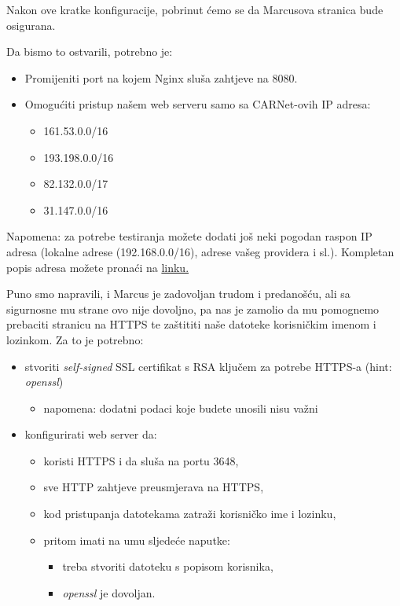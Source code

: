 \documentclass[12pt,a4paper]{article}
\begin{document}
		Nakon ove kratke konfiguracije, pobrinut ćemo se da Marcusova stranica bude osigurana.

		Da bismo to ostvarili, potrebno je:
		\begin{itemize}
			\item Promijeniti port na kojem Nginx sluša zahtjeve na 8080.
			\item Omogućiti pristup našem web serveru samo sa CARNet-ovih IP adresa:
			\begin{itemize}
				\item 161.53.0.0/16
				\item 193.198.0.0/16
				\item 82.132.0.0/17
				\item 31.147.0.0/16
			\end{itemize}
		\end{itemize}
		Napomena: za potrebe testiranja možete dodati još neki pogodan raspon IP adresa (lokalne adrese (192.168.0.0/16), adrese vašeg providera i sl.). Kompletan popis adresa možete pronaći na \href{https://sysportal.carnet.hr/hr_alloclist}{linku.}


		\par Puno smo napravili, i Marcus je zadovoljan trudom i predanošću, ali sa sigurnosne mu strane ovo nije dovoljno, pa nas je zamolio da mu pomognemo prebaciti stranicu na HTTPS te zaštititi naše datoteke korisničkim imenom i lozinkom. Za to je potrebno:
		\begin{itemize}
			\item stvoriti \textit{self-signed} SSL certifikat s RSA ključem za potrebe HTTPS-a (hint: \textit{openssl})
				\begin{itemize}
					\item napomena: dodatni podaci koje budete unosili nisu važni
				\end{itemize}
			\item konfigurirati web server da:
			\begin{itemize}
				\item koristi HTTPS i da sluša na portu 3648,
				\item sve HTTP zahtjeve preusmjerava na HTTPS,
				\item kod pristupanja datotekama zatraži korisničko ime i lozinku,
				\item pritom imati na umu sljedeće naputke:
				\begin{itemize}
					\item treba stvoriti datoteku s popisom korisnika,
					\item \textit{openssl} je dovoljan.
				\end{itemize}
			\end{itemize}
		\end{itemize}
\end{document}
